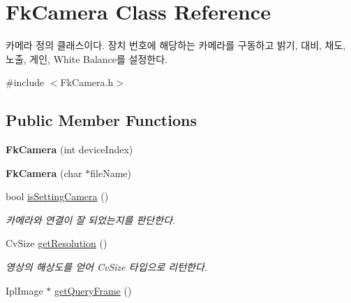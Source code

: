 \hypertarget{class_fk_camera}{}\section{Fk\+Camera Class Reference}
\label{class_fk_camera}


카메라 정의 클래스이다. 장치 번호에 해당하는 카메라를 구동하고 밝기, 대비, 채도, 노출, 게인, White Balance를 설정한다.  




{\ttfamily \#include $<$Fk\+Camera.\+h$>$}

\subsection*{Public Member Functions}
\begin{DoxyCompactItemize}
\item 
\hypertarget{class_fk_camera_a60b9b3b25192898045eca7cda0029603}{}{\bfseries Fk\+Camera} (int device\+Index)\label{class_fk_camera_a60b9b3b25192898045eca7cda0029603}

\item 
\hypertarget{class_fk_camera_a8a423374fb6e6eb4ad74b7656c2f0837}{}{\bfseries Fk\+Camera} (char $\ast$file\+Name)\label{class_fk_camera_a8a423374fb6e6eb4ad74b7656c2f0837}

\item 
\hypertarget{class_fk_camera_a376aba76bb5f8fb4a5c0aed19af923f6}{}bool \hyperlink{class_fk_camera_a376aba76bb5f8fb4a5c0aed19af923f6}{is\+Setting\+Camera} ()\label{class_fk_camera_a376aba76bb5f8fb4a5c0aed19af923f6}

\begin{DoxyCompactList}\small\item\em 카메라와 연결이 잘 되었는지를 판단한다. \end{DoxyCompactList}\item 
\hypertarget{class_fk_camera_af03c7084f202016f96b8808d61335343}{}Cv\+Size \hyperlink{class_fk_camera_af03c7084f202016f96b8808d61335343}{get\+Resolution} ()\label{class_fk_camera_af03c7084f202016f96b8808d61335343}

\begin{DoxyCompactList}\small\item\em 영상의 해상도를 얻어 Cv\+Size 타입으로 리턴한다. \end{DoxyCompactList}\item 
\hypertarget{class_fk_camera_a86c509d2a15f35a4d02d5122381da048}{}Ipl\+Image $\ast$ \hyperlink{class_fk_camera_a86c509d2a15f35a4d02d5122381da048}{get\+Query\+Frame} ()\label{class_fk_camera_a86c509d2a15f35a4d02d5122381da048}


\end{DoxyCompactItemize}
